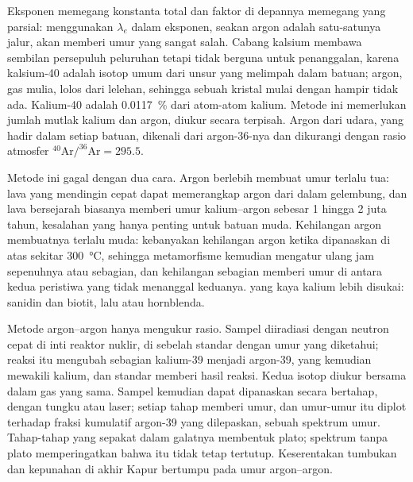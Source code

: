Eksponen memegang konstanta total dan faktor di depannya memegang yang parsial: menggunakan $\lambda_e$ dalam eksponen, seakan argon adalah satu-satunya jalur, akan memberi umur yang sangat salah. Cabang kalsium membawa sembilan persepuluh peluruhan tetapi tidak berguna untuk penanggalan, karena kalsium-40 adalah isotop umum dari unsur yang melimpah dalam batuan; argon, gas mulia, lolos dari lelehan, sehingga sebuah kristal mulai dengan hampir tidak ada. Kalium-40 adalah \qty{0.0117}{\percent} dari atom-atom kalium. Metode ini memerlukan jumlah mutlak kalium dan argon, diukur secara terpisah. Argon dari udara, yang hadir dalam setiap batuan, dikenali dari argon-36-nya dan dikurangi dengan rasio atmosfer $^{40}\mathrm{Ar}/^{36}\mathrm{Ar} = 295.5$.

Metode ini gagal dengan dua cara. Argon berlebih membuat umur terlalu tua: lava yang mendingin cepat dapat memerangkap argon dari  dalam gelembung, dan lava bersejarah biasanya memberi umur kalium--argon sebesar 1 hingga 2 juta tahun, kesalahan yang hanya penting untuk batuan muda. Kehilangan argon membuatnya terlalu muda: kebanyakan  kehilangan argon ketika dipanaskan di atas sekitar \qty{300}{\celsius}, sehingga metamorfisme kemudian mengatur ulang jam sepenuhnya atau sebagian, dan kehilangan sebagian memberi umur di antara kedua peristiwa yang tidak menanggal keduanya.  yang kaya kalium lebih disukai: sanidin dan biotit, lalu  atau hornblenda.

Metode argon--argon hanya mengukur rasio. Sampel diiradiasi dengan neutron cepat di inti reaktor nuklir, di sebelah  standar dengan umur yang diketahui; reaksi itu mengubah sebagian kalium-39 menjadi argon-39, yang kemudian mewakili kalium, dan standar memberi hasil reaksi. Kedua isotop diukur bersama dalam gas yang sama. Sampel kemudian dapat dipanaskan secara bertahap, dengan tungku atau laser; setiap tahap memberi umur, dan umur-umur itu diplot terhadap fraksi kumulatif argon-39 yang dilepaskan, sebuah spektrum umur. Tahap-tahap yang sepakat dalam galatnya membentuk plato; spektrum tanpa plato memperingatkan bahwa  itu tidak tetap tertutup. Keserentakan tumbukan dan kepunahan di akhir Kapur bertumpu pada umur argon--argon.

